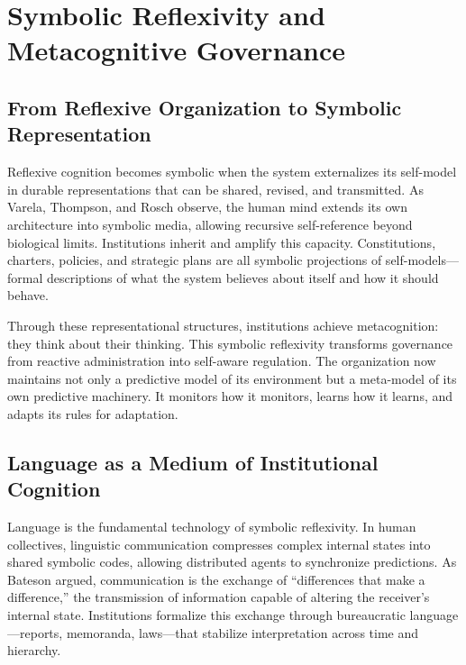 \documentclass[11pt,a4paper]{article}
\begin{document}

\section{Symbolic Reflexivity and Metacognitive Governance}
\label{sec:symbolic-reflexivity}

\subsection{From Reflexive Organization to Symbolic Representation}

Reflexive cognition becomes symbolic when the system externalizes its self-model in durable representations that can be shared, revised, and transmitted.  As Varela, Thompson, and Rosch \citep{VarelaThompsonRosch1991EmbodiedMind} observe, the human mind extends its own architecture into symbolic media, allowing recursive self-reference beyond biological limits.  Institutions inherit and amplify this capacity.  Constitutions, charters, policies, and strategic plans are all symbolic projections of self-models—formal descriptions of what the system believes about itself and how it should behave.

Through these representational structures, institutions achieve metacognition: they think about their thinking.  This symbolic reflexivity transforms governance from reactive administration into self-aware regulation.  The organization now maintains not only a predictive model of its environment but a meta-model of its own predictive machinery.  It monitors how it monitors, learns how it learns, and adapts its rules for adaptation.

\subsection{Language as a Medium of Institutional Cognition}

Language is the fundamental technology of symbolic reflexivity.  In human collectives, linguistic communication compresses complex internal states into shared symbolic codes, allowing distributed agents to synchronize predictions.  As Bateson \citep{Bateson1972StepsToAnEcologyOfMind} argued, communication is the exchange of “differences that make a difference,” the transmission of information capable of altering the receiver’s internal state.  Institutions formalize this exchange through bureaucratic language—reports, memoranda, laws—that stabilize interpretation across time and hierarchy.
\end{document}
